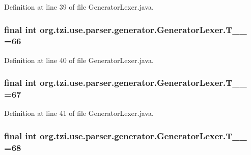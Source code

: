 Definition at line 39 of file Generator\-Lexer.\-java.

\hypertarget{classorg_1_1tzi_1_1use_1_1parser_1_1generator_1_1_generator_lexer_a31a417215216960d26b3a4c99bde473d}{
\subsubsection[{T\-\_\-\-\_\-66}]{\setlength{\rightskip}{0pt plus 5cm}final int org.\-tzi.\-use.\-parser.\-generator.\-Generator\-Lexer.\-T\-\_\-\-\_ =66\hspace{0.3cm}{\ttfamily [static]}}}\label{classorg_1_1tzi_1_1use_1_1parser_1_1generator_1_1_generator_lexer_a31a417215216960d26b3a4c99bde473d}


Definition at line 40 of file Generator\-Lexer.\-java.

\hypertarget{classorg_1_1tzi_1_1use_1_1parser_1_1generator_1_1_generator_lexer_a3c060ad32bade5f93ab4b7c60aee4609}{
\subsubsection[{T\-\_\-\-\_\-67}]{\setlength{\rightskip}{0pt plus 5cm}final int org.\-tzi.\-use.\-parser.\-generator.\-Generator\-Lexer.\-T\-\_\-\-\_ =67\hspace{0.3cm}{\ttfamily [static]}}}\label{classorg_1_1tzi_1_1use_1_1parser_1_1generator_1_1_generator_lexer_a3c060ad32bade5f93ab4b7c60aee4609}


Definition at line 41 of file Generator\-Lexer.\-java.

\hypertarget{classorg_1_1tzi_1_1use_1_1parser_1_1generator_1_1_generator_lexer_a37fb3961115a0005c4dc93f975d41642}{
\subsubsection[{T\-\_\-\-\_\-68}]{\setlength{\rightskip}{0pt plus 5cm}final int org.\-tzi.\-use.\-parser.\-generator.\-Generator\-Lexer.\-T\-\_\-\-\_ =68\hspace{0.3cm}{\ttfamily [static]}}}\label{classorg_1_1tzi_1_1use_1_1parser_1_1generator_1_1_generator_lexer_a37fb3961115a0005c4dc93f975d41642}


